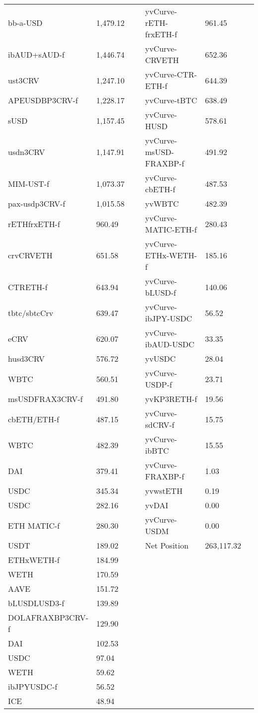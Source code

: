\begin{longtable}{@{}p{0.25\linewidth}p{0.25\linewidth}p{0.25\linewidth}p{0.25\linewidth}@{}}
bb-a-USD & 1,479.12 & yvCurve-rETH-frxETH-f &961.45 \\
ibAUD+sAUD-f & 1,446.74 & yvCurve-CRVETH &652.36 \\
ust3CRV & 1,247.10 & yvCurve-CTR-ETH-f &644.39 \\
APEUSDBP3CRV-f & 1,228.17 & yvCurve-tBTC &638.49 \\
sUSD & 1,157.45 & yvCurve-HUSD &578.61 \\
usdn3CRV & 1,147.91 & yvCurve-msUSD-FRAXBP-f &491.92 \\
MIM-UST-f & 1,073.37 & yvCurve-cbETH-f &487.53 \\
pax-usdp3CRV-f & 1,015.58 & yvWBTC &482.39 \\
rETHfrxETH-f & 960.49 & yvCurve-MATIC-ETH-f &280.43 \\
crvCRVETH & 651.58 & yvCurve-ETHx-WETH-f &185.16 \\
CTRETH-f & 643.94 & yvCurve-bLUSD-f &140.06 \\
tbtc/sbtcCrv & 639.47 & yvCurve-ibJPY-USDC &56.52 \\
eCRV & 620.07 & yvCurve-ibAUD-USDC &33.35 \\
husd3CRV & 576.72 & yvUSDC &28.04 \\
WBTC & 560.51 & yvCurve-USDP-f &23.71 \\
msUSDFRAX3CRV-f & 491.80 & yvKP3RETH-f &19.56 \\
cbETH/ETH-f & 487.15 & yvCurve-sdCRV-f &15.75 \\
WBTC & 482.39 & yvCurve-ibBTC &15.55 \\
DAI & 379.41 & yvCurve-FRAXBP-f &1.03 \\
USDC & 345.34 & yvwstETH &0.19 \\
USDC & 282.16 & yvDAI &0.00 \\
ETH MATIC-f & 280.30 & yvCurve-USDM &0.00 \\
USDT & 189.02 & Net Position &263,117.32 \\
ETHxWETH-f & 184.99 & & \\
WETH & 170.59 & & \\
AAVE & 151.72 & & \\
bLUSDLUSD3-f & 139.89 & & \\
DOLAFRAXBP3CRV-f & 129.90 & & \\
DAI & 102.53 & & \\
USDC & 97.04 & & \\
WETH & 59.62 & & \\
ibJPYUSDC-f & 56.52 & & \\
ICE & 48.94 & & \\

\end{longtable}
